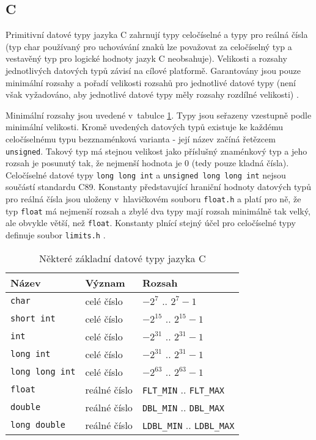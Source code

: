 \documentclass{bakalarka}
\begin{document}
\subsection{C}
Primitivní datové typy jazyka C zahrnují typy celočíselné a typy pro reálná čísla (typ char používaný pro uchovávání znaků lze považovat za celočíselný typ a vestavěný typ pro logické hodnoty jazyk C neobsahuje). Velikosti a rozsahy jednotlivých datových typů závisí na cílové platformě. Garantovány jsou pouze minimální rozsahy a pořadí velikosti rozsahů pro jednotlivé datové typy (není však vyžadováno, aby jednotlivé datové typy měly rozsahy rozdílné velikosti) \cite{c-guide}.\par

Minimální rozsahy jsou uvedené v~tabulce \ref{table:c-types}. Typy jsou seřazeny vzestupně podle minimální velikosti. Kromě uvedených datových typů existuje ke každému celočíselnému typu bezznaménková varianta - její název začíná řetězcem \texttt{unsigned}. Takový typ má stejnou velikost jako příslušný znaménkový typ a jeho rozsah je posunutý tak, že nejmenší hodnota je 0 (tedy pouze kladná čísla). Celočíselné datové typy \texttt{long long int} a \texttt{unsigned long long int} nejsou součástí standardu C89. Konstanty představující hraniční hodnoty datových typů pro reálná čísla jsou uloženy v~hlavičkovém souboru \texttt{float.h} a platí pro ně, že typ \texttt{float} má nejmenší rozsah a zbylé dva typy mají rozsah minimálně tak velký, ale obvykle větší, než \texttt{float}. Konstanty plnící stejný účel pro celočíselné typy definuje soubor \texttt{limits.h} \cite{c-guide}.

\begin{table}\centering
\caption{Některé základní datové typy jazyka C}
\begin{tabular}{| l | l | l |}
\hline
\textbf{Název} & \textbf{Význam} & \textbf{Rozsah} \\ \hline
\texttt{char} & celé číslo & $-2^7$ .. $2^7-1$ \\ \hline
\texttt{short int} & celé číslo & $-2^{15}$ .. $2^{15}-1$ \\ \hline
\texttt{int} & celé číslo & $-2^{31}$ .. $2^{31}-1$ \\ \hline
\texttt{long int} & celé číslo & $-2^{31}$ .. $2^{31}-1$ \\ \hline
\texttt{long long int} & celé číslo & $-2^{63}$ .. $2^{63}-1$ \\ \hline
\texttt{float} & reálné číslo & \texttt{FLT\_MIN} .. \texttt{FLT\_MAX} \\ \hline
\texttt{double} & reálné číslo & \texttt{DBL\_MIN} .. \texttt{DBL\_MAX} \\ \hline
\texttt{long double} & reálné číslo & \texttt{LDBL\_MIN} .. \texttt{LDBL\_MAX} \\ \hline
\end{tabular}
\label{table:c-types}
\end{table}
\end{document}
